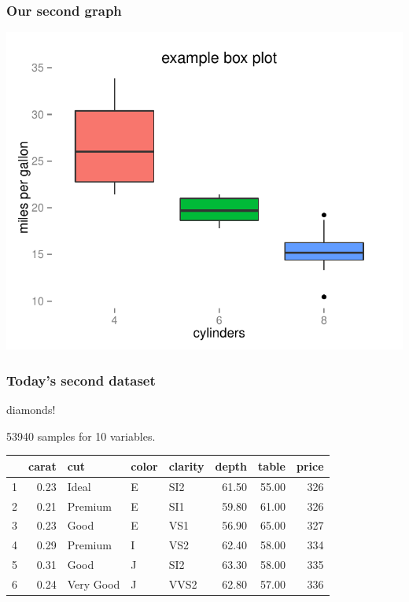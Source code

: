\documentclass{beamer}\usepackage{graphicx, color}
\makeatletter
\def\maxwidth{ %
  \ifdim\Gin@nat@width>\linewidth
    \linewidth
  \else
    \Gin@nat@width
  \fi
}
\newenvironment{knitrout}{}{} %
\makeatother
\begin{document}
\begin{frame}[fragile]
  \frametitle{Our second graph}
\begin{knitrout}
\color{fgcolor}
\includegraphics[width=\maxwidth]{figure/second-plot} 

\end{knitrout}


\end{frame}

\begin{frame}
  \frametitle{Today's second dataset}

  diamonds!

  53940 samples for 10 variables.

\begin{table}[ht]
\begin{center}
\begin{tabular}{rrlllrrr}
  \hline
 & carat & cut & color & clarity & depth & table & price \\ 
  \hline
1 & 0.23 & Ideal & E & SI2 & 61.50 & 55.00 & 326 \\ 
  2 & 0.21 & Premium & E & SI1 & 59.80 & 61.00 & 326 \\ 
  3 & 0.23 & Good & E & VS1 & 56.90 & 65.00 & 327 \\ 
  4 & 0.29 & Premium & I & VS2 & 62.40 & 58.00 & 334 \\ 
  5 & 0.31 & Good & J & SI2 & 63.30 & 58.00 & 335 \\ 
  6 & 0.24 & Very Good & J & VVS2 & 62.80 & 57.00 & 336 \\ 
   \hline
\end{tabular}
\end{center}
\end{table}



\end{frame}
\end{document}
